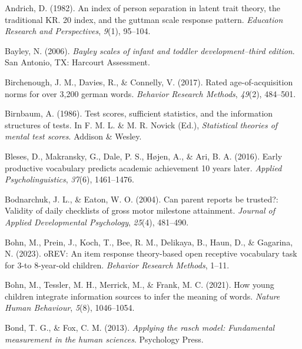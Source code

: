 \documentclass[
  man,floatsintext]{apa6}
\newlength{\cslhangindent}
\newlength{\cslentryspacingunit} %
\newenvironment{CSLReferences}[2] %
 {%
  \setlength{\parindent}{0pt}
  \ifodd #1
  \let\oldpar\par
  \def\par{\hangindent=\cslhangindent\oldpar}
  \fi
  \setlength{\parskip}{#2\cslentryspacingunit}
 }%
 {}
\begin{document}
\hypertarget{refs}{}
\begin{CSLReferences}{1}{0}
\leavevmode{}%
Andrich, D. (1982). An index of person separation in latent trait theory, the traditional KR. 20 index, and the guttman scale response pattern. \emph{Education Research and Perspectives}, \emph{9}(1), 95--104.

\leavevmode{}%
Bayley, N. (2006). \emph{Bayley scales of infant and toddler development--third edition}. San Antonio, TX: Harcourt Assessment.

\leavevmode{}%
Birchenough, J. M., Davies, R., \& Connelly, V. (2017). Rated age-of-acquisition norms for over 3,200 german words. \emph{Behavior Research Methods}, \emph{49}(2), 484--501.

\leavevmode{}%
Birnbaum, A. (1986). Test scores, sufficient statistics, and the information structures of tests. In F. M. L. \& M. R. Novick (Ed.), \emph{Statistical theories of mental test scores}. Addison \& Wesley.

\leavevmode{}%
Bleses, D., Makransky, G., Dale, P. S., Højen, A., \& Ari, B. A. (2016). Early productive vocabulary predicts academic achievement 10 years later. \emph{Applied Psycholinguistics}, \emph{37}(6), 1461--1476.

\leavevmode{}%
Bodnarchuk, J. L., \& Eaton, W. O. (2004). Can parent reports be trusted?: Validity of daily checklists of gross motor milestone attainment. \emph{Journal of Applied Developmental Psychology}, \emph{25}(4), 481--490.

\leavevmode{}%
Bohn, M., Prein, J., Koch, T., Bee, R. M., Delikaya, B., Haun, D., \& Gagarina, N. (2023). oREV: An item response theory-based open receptive vocabulary task for 3-to 8-year-old children. \emph{Behavior Research Methods}, 1--11.

\leavevmode{}%
Bohn, M., Tessler, M. H., Merrick, M., \& Frank, M. C. (2021). How young children integrate information sources to infer the meaning of words. \emph{Nature Human Behaviour}, \emph{5}(8), 1046--1054.

\leavevmode{}%
Bond, T. G., \& Fox, C. M. (2013). \emph{Applying the rasch model: Fundamental measurement in the human sciences}. Psychology Press.


\end{CSLReferences}
\end{document}
